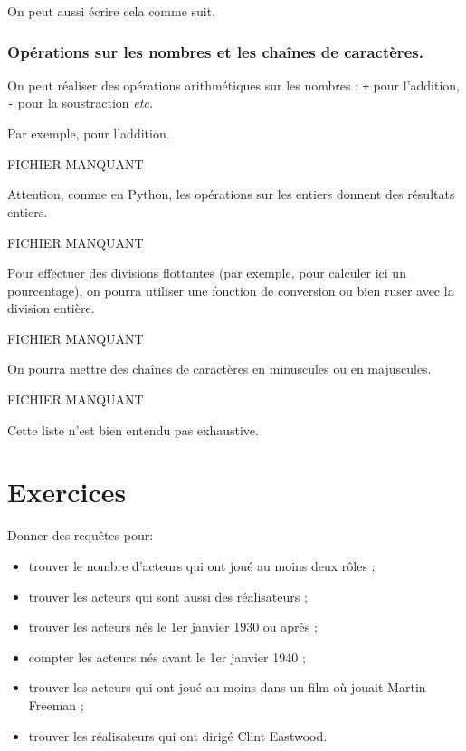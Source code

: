 On peut aussi écrire cela comme suit. 

\begin{center}
\end{center}
\subsubsection{Opérations sur les nombres et les chaînes de caractères.}

On peut réaliser des opérations arithmétiques sur les nombres : \texttt{+} pour l'addition, \texttt{-} pour la soustraction \emph{etc.}    

Par exemple, pour l'addition.

\begin{center}
FICHIER MANQUANT %
\end{center}

Attention, comme en Python, les opérations sur les entiers donnent des résultats entiers. 

\begin{center}
FICHIER MANQUANT %
\end{center}

Pour effectuer des divisions flottantes (par exemple, pour calculer ici un pourcentage), on pourra utiliser une fonction de conversion ou bien ruser avec la division entière.

\begin{center}
FICHIER MANQUANT %
\end{center}

On pourra mettre des chaînes de caractères en minuscules ou en majuscules.

\begin{center}
FICHIER MANQUANT %
\end{center}

Cette liste n'est bien entendu pas exhaustive. 

\section{Exercices}

Donner des requêtes pour:

\begin{itemize}
\item trouver le nombre d'acteurs qui ont joué au moins deux rôles ;
\item trouver les acteurs qui sont aussi des réalisateurs ;
\item trouver les acteurs nés le 1er janvier 1930 ou après ;
\item compter les acteurs nés avant le 1er janvier 1940 ;
\item trouver les acteurs qui ont joué au moins dans un film où jouait
  Martin Freeman ;
\item trouver les réalisateurs qui ont dirigé Clint Eastwood.
\end{itemize}
